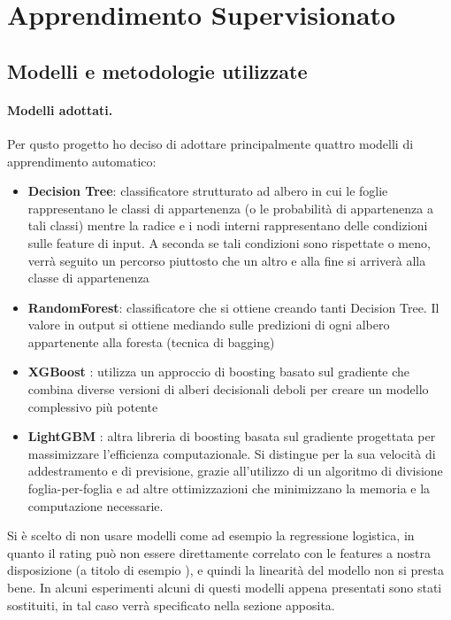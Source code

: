 \section{Apprendimento Supervisionato}

\subsection{Modelli e metodologie utilizzate}

\paragraph{Modelli adottati.} Per qusto progetto ho deciso di adottare principalmente quattro modelli di apprendimento automatico:
\begin{itemize}[label=-]
    \item \textbf{Decision Tree}: classificatore strutturato ad albero in cui le foglie
    rappresentano le classi di appartenenza (o le probabilità di appartenenza a tali
    classi) mentre la radice e i nodi interni rappresentano delle condizioni sulle
    feature di input. A seconda se tali condizioni sono rispettate o meno, verrà
    seguito un percorso piuttosto che un altro e alla fine si arriverà alla classe di
    appartenenza
    \item \textbf{RandomForest}: classificatore che si ottiene creando tanti Decision Tree. Il valore in output si ottiene mediando sulle predizioni di ogni albero
    appartenente alla foresta (tecnica di bagging)
    \item \textbf{XGBoost} \cite{xgboost}: utilizza un approccio di boosting basato sul gradiente che combina diverse versioni di alberi decisionali deboli per creare un modello complessivo più potente
    \item \textbf{LightGBM} \cite{lightgbm}: altra libreria di boosting basata sul gradiente progettata per massimizzare l'efficienza computazionale. Si distingue per la sua velocità di addestramento e di previsione, grazie all'utilizzo di un algoritmo di divisione foglia-per-foglia e ad altre ottimizzazioni che minimizzano la memoria e la computazione necessarie.
\end{itemize}
\noindent Si è scelto di non usare modelli come ad esempio la regressione logistica, in quanto il rating può non essere direttamente correlato con le features a nostra disposizione (a titolo di esempio \cite{ilfattoquotidiano}), e quindi la linearità del modello non si presta bene. In alcuni esperimenti alcuni di questi modelli appena presentati sono stati sostituiti, in tal caso verrà specificato nella sezione apposita.
